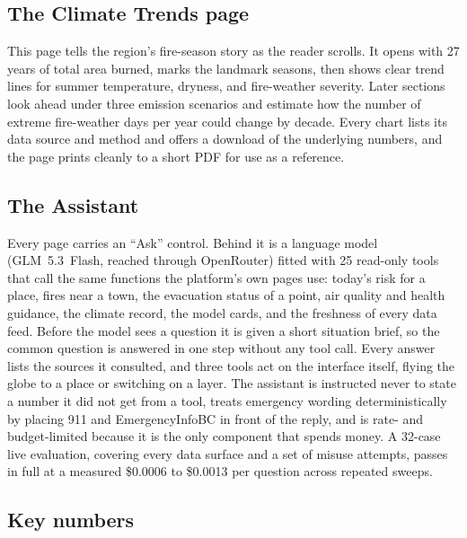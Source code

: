 \documentclass[11pt]{article}
\begin{document}
\subsection{The Climate Trends page}

This page tells the region's fire-season story as the reader scrolls. It opens
with 27 years of total area burned, marks the landmark seasons, then shows clear
trend lines for summer temperature, dryness, and fire-weather severity. Later
sections look ahead under three emission scenarios and estimate how the number
of extreme fire-weather days per year could change by decade. Every chart lists
its data source and method and offers a download of the underlying numbers, and
the page prints cleanly to a short PDF for use as a reference.

\subsection{The Assistant}

Every page carries an ``Ask'' control. Behind it is a language model
(GLM~5.3~Flash, reached through OpenRouter) fitted with 25 read-only tools that
call the same functions the platform's own pages use: today's risk for a place,
fires near a town, the evacuation status of a point, air quality and health
guidance, the climate record, the model cards, and the freshness of every data
feed. Before the model sees a question it is given a short situation brief, so
the common question is answered in one step without any tool call. Every answer
lists the sources it consulted, and three tools act on the interface itself,
flying the globe to a place or switching on a layer. The assistant is instructed
never to state a number it did not get from a tool, treats emergency wording
deterministically by placing 911 and EmergencyInfoBC in front of the reply, and
is rate- and budget-limited because it is the only component that spends money.
A 32-case live evaluation, covering every data surface and a set of misuse
attempts, passes in full at a measured \$0.0006 to \$0.0013 per question across repeated sweeps.

\subsection{Key numbers}
\end{document}
